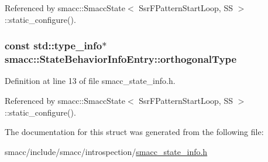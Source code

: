 Referenced by smacc\+::\+Smacc\+State$<$ Ssr\+F\+Pattern\+Start\+Loop, S\+S $>$\+::static\+\_\+configure().

\subsubsection[{\texorpdfstring{orthogonal\+Type}{orthogonalType}}]{\setlength{\rightskip}{0pt plus 5cm}const std\+::type\+\_\+info$\ast$ smacc\+::\+State\+Behavior\+Info\+Entry\+::orthogonal\+Type}\hypertarget{structsmacc_1_1StateBehaviorInfoEntry_aefc43616f2bd059594b3b90d6ad47916}{}\label{structsmacc_1_1StateBehaviorInfoEntry_aefc43616f2bd059594b3b90d6ad47916}


Definition at line 13 of file smacc\+\_\+state\+\_\+info.\+h.



Referenced by smacc\+::\+Smacc\+State$<$ Ssr\+F\+Pattern\+Start\+Loop, S\+S $>$\+::static\+\_\+configure().



The documentation for this struct was generated from the following file\+:\begin{DoxyCompactItemize}
\item 
smacc/include/smacc/introspection/\hyperlink{smacc__state__info_8h}{smacc\+\_\+state\+\_\+info.\+h}\end{DoxyCompactItemize}

